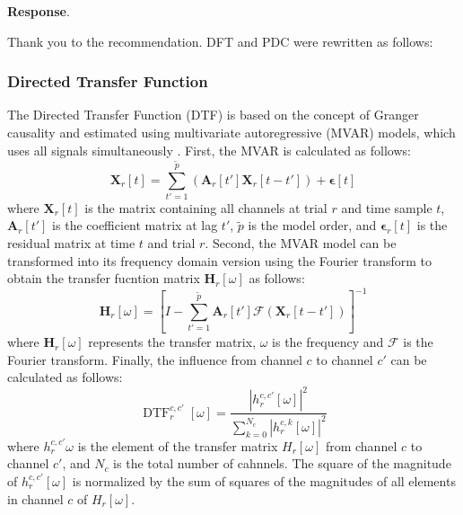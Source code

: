 \documentclass[runningheads]{llncs}
\newcommand{\mat}[1]{\bm {#1}}
\newenvironment{reviewer}{\setcounter{pointcounter}{1}}{}
\newcommand{\changes}[1]{\textcolor[rgb]{1.00,0.00,0.00}{#1}}
\newcommand{\reply}{\medskip \noindent \textbf{Response}.\ }
\begin{document}
\begin{reviewer}
\reply{
    Thank you to the recommendation. DFT and PDC were rewritten as follows:
    \changes{\subsubsection{Directed Transfer Function}
The Directed Transfer Function (DTF) is based on the concept of Granger causality and estimated using multivariate autoregressive (MVAR) models, which uses all signals simultaneously \cite{rezaei2023classification}. First, the MVAR is calculated as follows:
\begin{equation}
    \mat{X}_{r}[t] = \sum_{t'=1}^{\tilde{p}} \left( \mat{A}_{r}[t'] \mat{X}_{r}[t-t'] \right) + \mat{\epsilon}[t]
\end{equation}
where $\mat{X}_{r}[t]$ is the matrix containing all channels at trial $r$ and time sample $t$, $\mat{A}_{r}[t']$ is the coefficient matrix at lag $t'$, $\tilde{p}$ is the model order, and $\mat{\epsilon}_{r}[t]$ is the residual matrix at time $t$ and trial $r$. Second, the MVAR model can be transformed into its frequency domain version using the Fourier transform to obtain the transfer fucntion matrix $\mat{H}_{r}[\omega]$ as follows:
\begin{equation}
    \mat{H}_{r}[\omega] = \left[ I - \sum_{t'=1}^{\tilde{p}}  \mat{A}_{r}[t'] \mathscr{F}\left( \mat{X}_{r}[t-t'] \right) \right]^{-1}
\end{equation}
where $\mat{H}_{r}[\omega]$ represents the transfer matrix, $\omega$ is the frequency and $\mathscr{F}$ is the Fourier transform. Finally, the influence from channel $c$ to channel $c'$ can be calculated as follows:
\begin{equation}
    \operatorname{DTF}^{c,c'}_{r}[\omega] = \frac{|h^{c,c'}_{r}[\omega]|^2}{\sum_{k=0}^{N_c} |h^{c,k}_{r}[\omega]|^2}
\end{equation}
where $h^{c,c'}_{r}{\omega}$ is the element of the transfer matrix $H_{r}[\omega]$ from channel $c$ to channel $c'$, and $N_c$ is the total number of cahnnels. The square of the magnitude of $h^{c,c'}_{r}[\omega]$ is normalized by the sum of squares of the magnitudes of all elements in channel $c$ of $H_{r}[\omega]$.
}

}
\end{reviewer}
\end{document}
